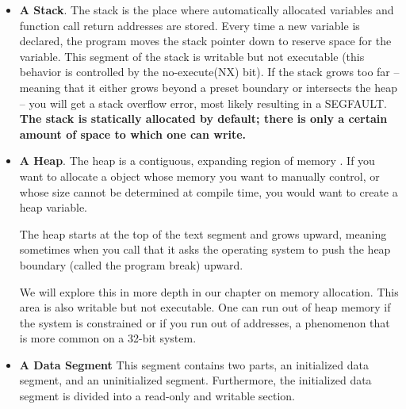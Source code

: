 \begin{itemize}
\item \textbf{A Stack}.
The stack is the place where automatically allocated variables and function call return addresses are stored.
Every time a new variable is declared, the program moves the stack pointer down to reserve space for the variable.
This segment of the stack is writable but not executable (this behavior is controlled by the no-execute(NX) bit).
If the stack grows too far -- meaning that it either grows beyond a preset boundary or intersects the heap -- you will get a stack overflow error, most likely resulting in a SEGFAULT.
\textbf{The stack is statically allocated by default; there is only a certain amount of space to which one can write.}

\item \textbf{A Heap}.
The heap is a contiguous, expanding region of memory \cite{mallocinternals}.
If you want to allocate a object whose memory you want to manually control, or whose size cannot be determined at compile time, you would want to create a heap variable.

The heap starts at the top of the text segment and grows upward, meaning sometimes when you call  that it asks the operating system to push the heap boundary (called the program break) upward.

We will explore this in more depth in our chapter on memory allocation.
This area is also writable but not executable.
One can run out of heap memory if the system is constrained or if you run out of addresses, a phenomenon that is more common on a 32-bit system.

\item \textbf{A Data Segment}
    This segment contains two parts, an initialized data segment, and an uninitialized segment. Furthermore, the initialized data segment is divided into a read-only and writable section.

\end{itemize}

